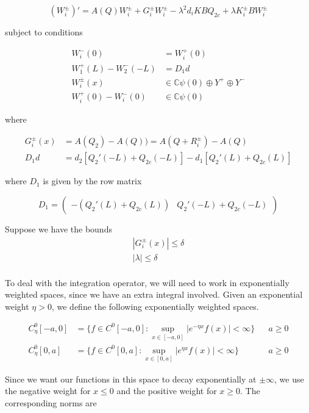 \documentclass[12pt]{article}
\def\C{{\mathbb C}}
\begin{document}
\begin{equation}\label{inteigQ2}
(W_i^\pm)' = A(Q)W_i^\pm + G_i^\pm W_i^\pm - \lambda^2 d_i K B Q_{2c} + \lambda K_i^\pm BW_i^\pm 
\end{equation}

subject to conditions

\begin{align*}
W_i^-(0) &= W_i^+(0) \\
W_1^+(L) - W_2^-(-L) &= D_1 d \\
W_i^\pm(x) &\in \C \psi(0) \oplus Y^+ \oplus Y^- \\
W_i^+(0) - W_i^-(0) &\in \C \psi(0) 
\end{align*}

where

\begin{align*}
G_i^\pm(x) &= A(Q_2) - A(Q)) = A(Q + R_i^\pm) - A(Q) \\
D_1 d &= d_2 [ Q_2'(-L) + Q_{2c}(-L)] - d_1 [ Q_2'(L) + Q_{2c}(L)]
\end{align*}

where $D_1$ is given by the row matrix 

\[
D_1 = \begin{pmatrix} -(Q_2'(L) + Q_{2c}(L)) & Q_2'(-L) + Q_{2c}(-L) \end{pmatrix}
\]

Suppose we have the bounds
\begin{align*}
|G_i^\pm(x)| \leq \delta \\
|\lambda| \leq \delta \\
\end{align*}

To deal with the integration operator, we will need to work in exponentially weighted spaces, since we have an extra integral involved. Given an exponential weight $\eta > 0$, we define the following exponentially weighted spaces.

\begin{align*}
C^0_\eta[-a, 0] &= \{ f \in C^0[-a, 0] : \sup_{x \in [-a, 0]} |e^{-\eta x} f(x) | < \infty \} && a \geq 0 \\
C^0_\eta[0, a] &= \{ f \in C^0[0, a] : \sup_{x \in [0, a]} |e^{\eta x} f(x) | < \infty \} && a \geq 0 
\end{align*}

Since we want our functions in this space to decay exponentially at $\pm \infty$, we use the negative weight for $x \leq 0$ and the positive weight for $x \geq 0$. The corresponding norms are 
\end{document}
